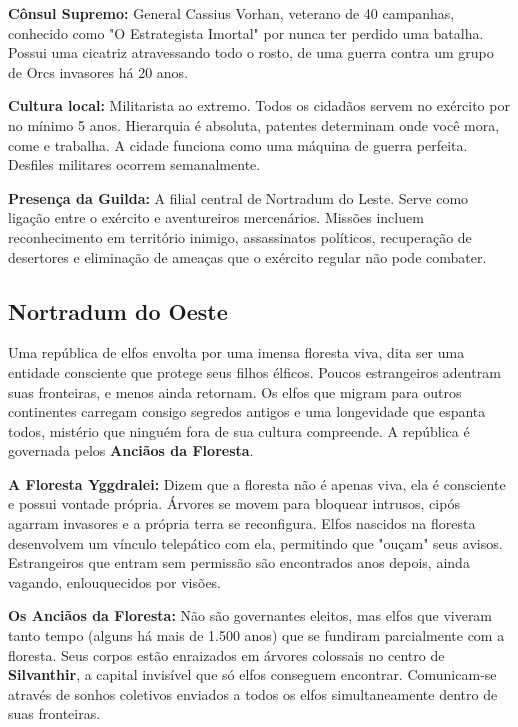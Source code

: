 \textbf{\ringmfamily Cônsul Supremo:} General Cassius Vorhan, veterano de 40 campanhas, conhecido como "O Estrategista Imortal" por nunca ter perdido uma batalha. Possui uma cicatriz atravessando todo o rosto, de uma guerra contra um grupo de Orcs invasores há 20 anos.

\textbf{\ringmfamily Cultura local:} Militarista ao extremo. Todos os cidadãos servem no exército por no mínimo 5 anos. Hierarquia é absoluta, patentes determinam onde você mora, come e trabalha. A cidade funciona como uma máquina de guerra perfeita. Desfiles militares ocorrem semanalmente.

\textbf{\ringmfamily Presença da Guilda:} A filial central de Nortradum do Leste. Serve como ligação entre o exército e aventureiros mercenários. Missões incluem reconhecimento em território inimigo, assassinatos políticos, recuperação de desertores e eliminação de ameaças que o exército regular não pode combater.

\subsection*{Nortradum do Oeste}
Uma república de elfos envolta por uma imensa floresta viva, dita ser uma entidade consciente que protege seus filhos élficos. Poucos estrangeiros adentram suas fronteiras, e menos ainda retornam. Os elfos que migram para outros continentes carregam consigo segredos antigos e uma longevidade que espanta todos, mistério que ninguém fora de sua cultura compreende. A república é governada pelos \textbf{Anciãos da Floresta}.

\textbf{\ringmfamily A Floresta Yggdralei:} Dizem que a floresta não é apenas viva, ela é consciente e possui vontade própria. Árvores se movem para bloquear intrusos, cipós agarram invasores e a própria terra se reconfigura. Elfos nascidos na floresta desenvolvem um vínculo telepático com ela, permitindo que "ouçam" seus avisos. Estrangeiros que entram sem permissão são encontrados anos depois, ainda vagando, enlouquecidos por visões.

\textbf{\ringmfamily Os Anciãos da Floresta:} Não são governantes eleitos, mas elfos que viveram tanto tempo (alguns há mais de 1.500 anos) que se fundiram parcialmente com a floresta. Seus corpos estão enraizados em árvores colossais no centro de \textbf{Silvanthir}, a capital invisível que só elfos conseguem encontrar. Comunicam-se através de sonhos coletivos enviados a todos os elfos simultaneamente dentro de suas fronteiras.

